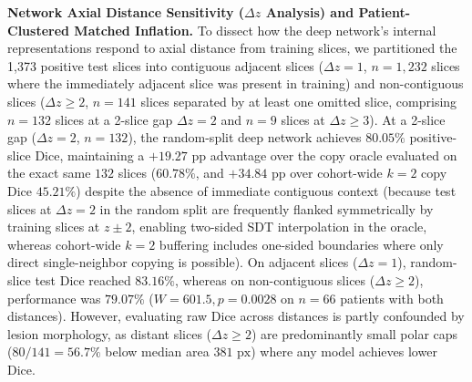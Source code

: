 \documentclass[11pt,a4paper]{article}
\begin{document}
\noindent\textbf{Network Axial Distance Sensitivity ($\Delta z$ Analysis) and Patient-Clustered Matched Inflation.}
To dissect how the deep network's internal representations respond to axial distance from training slices, we partitioned the 1,373 positive test slices into contiguous adjacent slices ($\Delta z = 1$, $n = 1,232$ slices where the immediately adjacent slice was present in training) and non-contiguous slices ($\Delta z \ge 2$, $n = 141$ slices separated by at least one omitted slice, comprising $n = 132$ slices at a 2-slice gap $\Delta z = 2$ and $n = 9$ slices at $\Delta z \ge 3$). At a 2-slice gap ($\Delta z = 2$, $n = 132$), the random-split deep network achieves $80.05\%$ positive-slice Dice, maintaining a $+19.27\text{ pp}$ advantage over the copy oracle evaluated on the exact same $132$ slices ($60.78\%$, and $+34.84\text{ pp}$ over cohort-wide $k=2$ copy Dice $45.21\%$) despite the absence of immediate contiguous context (because test slices at $\Delta z = 2$ in the random split are frequently flanked symmetrically by training slices at $z \pm 2$, enabling two-sided SDT interpolation in the oracle, whereas cohort-wide $k=2$ buffering includes one-sided boundaries where only direct single-neighbor copying is possible). On adjacent slices ($\Delta z = 1$), random-slice test Dice reached $83.16\%$, whereas on non-contiguous slices ($\Delta z \ge 2$), performance was $79.07\%$ ($W = 601.5, p = 0.0028$ on $n = 66$ patients with both distances). However, evaluating raw Dice across distances is partly confounded by lesion morphology, as distant slices ($\Delta z \ge 2$) are predominantly small polar caps ($80 / 141 = 56.7\%$ below median area $381\text{ px}$) where any model achieves lower Dice.
\end{document}
